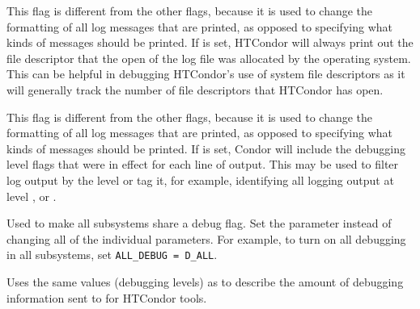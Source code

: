 \begin{description}
\begin{description}
  \label{dflag:fds}
  \item[\Dflag{FDS}]
    This flag is different from the other flags, because it is
    used to change the formatting of all log messages that are printed,
    as opposed to specifying what kinds of messages should be printed.
    If  is set, HTCondor will always print out the file descriptor
    that the open of the log file was allocated by the operating system.
    This can be helpful in debugging HTCondor's use of system file
    descriptors as it will generally track the number of file descriptors
    that HTCondor has open.

  \label{dflag:category}
  \item[\Dflag{CATEGORY}]
    This flag is different from the other flags, because it is
    used to change the formatting of all log messages that are printed,
    as opposed to specifying what kinds of messages should be printed.
    If  is set, Condor will include the debugging level flags 
    that were in effect for each line of output.  
    This may be used to filter log output by the level or 
    tag it, for example, identifying all
    logging output at level , or .

  \end{description}

\label{param:AllDebug}
\item[\Macro{ALL\_DEBUG}]
  Used to make all subsystems
  share a debug flag. Set the parameter 
  instead of changing all of the individual parameters.  For example,
  to turn on all debugging in all subsystems, set
  \verb$ALL_DEBUG = D_ALL$.

\label{param:ToolDebug}
\item[\Macro{TOOL\_DEBUG}]
  Uses the same values (debugging levels) as  to
  describe the amount of debugging information sent to  
  for HTCondor tools.

\end{description}

